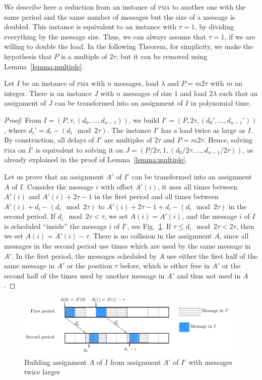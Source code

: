 \documentclass[a4paper,UKenglish,cleveref, autoref, thm-restate]{lipics-v2019}
\newcommand\pma{\textsc{pma}\xspace}
\begin{document}
We describe here a reduction from an instance of \pma to another one with the same period and the same number of messages but the size of a message is doubled. This instance is equivalent to an instance with $\tau = 1$, by dividing everything by the message size. Thus, we can always assume that $\tau = 1$, if we are willing to double the load. In the following Theorem, for simplicity, we make the hypothesis that $P$ is a multiple of $2\tau$, but it can be removed using Lemma~\ref{lemma:multiple}. 


\begin{theorem}\label{th:double_load}
Let $I$ be an instance of \pma with $n$ messages, load $\lambda$ and $P=m2\tau$ with $m$ an integer. There is an instance $J$ with $n$ messages of size $1$ and load $2\lambda$ such that an assignment of $J$ can be transformed into an assignment of $I$ in polynomial time.
\end{theorem}
\begin{proof}
From $I = (P,\tau,(d_{0},\dots,d_{n-1}))$, we build $I' = (P, 2\tau, (d_{0}',\dots,d_{n-1}'))$, where $d_i' = d_{i} - (d_{i} \mod 2\tau)$. The instance $I'$ has a load twice as large as $I$.
By construction, all delays of $I'$ are multiples of $2\tau$ and $P = m2\tau$.
Hence, solving \pma on $I'$ is equivalent to solving it on $J = (P/2\tau, 1,(d_{0}/ 2\tau,\dots,d_{n-1} /2\tau))$, as already explained in the proof of Lemma~\ref{lemma:multiple}. 

Let us prove that an assignment $A'$ of $I'$ can be transformed into an assignment $A$ of $I$. 
Consider the message $i$ with offset $A'(i)$, it uses all times between $A'(i)$ and $A'(i) + 2\tau -1$ in the first period and all times between $A'(i) + d_{i} - (d_{i} \mod 2\tau)$ to $A'(i) + 2\tau -1+ d_{i} - (d_{i} \mod 2\tau)$ in the second period. 
If $d_{i} \mod 2\tau < \tau $, we set $A(i) = A'(i)$, and the message $i$ of $I$ is scheduled ``inside'' the 
message $i$ of $I'$, see Fig.~\ref{fig:transf_2tau}. If $\tau \leq d_{i} \mod 2\tau < 2\tau$, then we set 
$A(i) = A'(i) - \tau$. There is no collision in the assignment $A$, since all messages in the second period use times which are used by the same message in $A'$. In the first period, the messages scheduled by $A$ use either the first half of the same message in $A'$ or the position $\tau$ before, which is either free in $A'$ or the second half of the times used by another message in $A'$ and thus not used in $A$. 
\end{proof}
\begin{figure}[h]
\begin{center}

\includegraphics[scale=0.7]{transfo2tau}
\end{center}
\caption{Building assignment $A$ of $I$ from assignment $A'$ of $I'$ with messages twice larger}
\label{fig:transf_2tau}
\end{figure}
 
\end{document}
